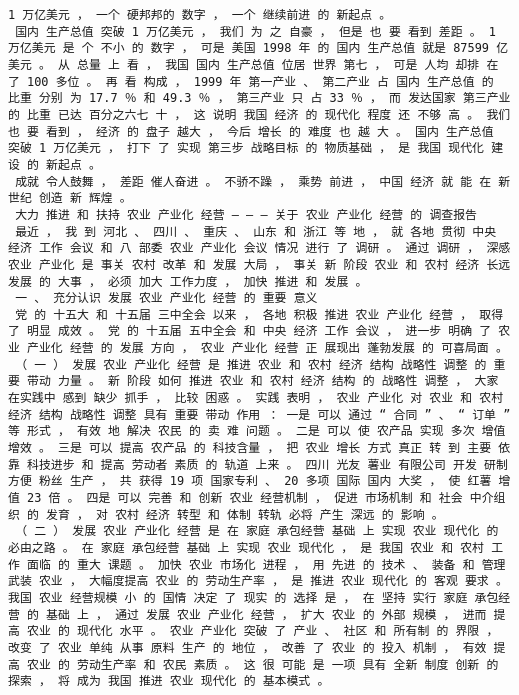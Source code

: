 \documentclass{article}
\begin{document}
\begin{Verbatim}[commandchars=\\\{\}]
 1 万亿美元 ， 一个 硬邦邦的 数字 ， 一个 继续前进 的 新起点 。 
 国内 生产总值 突破 1 万亿美元 ， 我们 为 之 自豪 ， 但是 也 要 看到 差距 。 1 万亿美元 是 个 不小 的 数字 ， 可是 美国 1998 年 的 国内 生产总值 就是 87599 亿美元 。 从 总量 上 看 ， 我国 国内 生产总值 位居 世界 第七 ， 可是 人均 却排 在 了 100 多位 。 再 看 构成 ， 1999 年 第一产业 、 第二产业 占 国内 生产总值 的 比重 分别 为 17.7 ％ 和 49.3 ％ ， 第三产业 只 占 33 ％ ， 而 发达国家 第三产业 的 比重 已达 百分之六七 十 ， 这 说明 我国 经济 的 现代化 程度 还 不够 高 。 我们 也 要 看到 ， 经济 的 盘子 越大 ， 今后 增长 的 难度 也 越 大 。 国内 生产总值 突破 1 万亿美元 ， 打下 了 实现 第三步 战略目标 的 物质基础 ， 是 我国 现代化 建设 的 新起点 。 
 成就 令人鼓舞 ， 差距 催人奋进 。 不骄不躁 ， 乘势 前进 ， 中国 经济 就 能 在 新世纪 创造 新 辉煌 。 
 大力 推进 和 扶持 农业 产业化 经营 — — — 关于 农业 产业化 经营 的 调查报告 
 最近 ， 我 到 河北 、 四川 、 重庆 、 山东 和 浙江 等 地 ， 就 各地 贯彻 中央 经济 工作 会议 和 八 部委 农业 产业化 会议 情况 进行 了 调研 。 通过 调研 ， 深感 农业 产业化 是 事关 农村 改革 和 发展 大局 ， 事关 新 阶段 农业 和 农村 经济 长远 发展 的 大事 ， 必须 加大 工作力度 ， 加快 推进 和 发展 。 
 一 、 充分认识 发展 农业 产业化 经营 的 重要 意义 
 党 的 十五大 和 十五届 三中全会 以来 ， 各地 积极 推进 农业 产业化 经营 ， 取得 了 明显 成效 。 党 的 十五届 五中全会 和 中央 经济 工作 会议 ， 进一步 明确 了 农业 产业化 经营 的 发展 方向 ， 农业 产业化 经营 正 展现出 蓬勃发展 的 可喜局面 。 
 （ 一 ） 发展 农业 产业化 经营 是 推进 农业 和 农村 经济 结构 战略性 调整 的 重要 带动 力量 。 新 阶段 如何 推进 农业 和 农村 经济 结构 的 战略性 调整 ， 大家 在实践中 感到 缺少 抓手 ， 比较 困惑 。 实践 表明 ， 农业 产业化 对 农业 和 农村 经济 结构 战略性 调整 具有 重要 带动 作用 ： 一是 可以 通过 “ 合同 ” 、 “ 订单 ” 等 形式 ， 有效 地 解决 农民 的 卖 难 问题 。 二是 可以 使 农产品 实现 多次 增值 增效 。 三是 可以 提高 农产品 的 科技含量 ， 把 农业 增长 方式 真正 转 到 主要 依靠 科技进步 和 提高 劳动者 素质 的 轨道 上来 。 四川 光友 薯业 有限公司 开发 研制 方便 粉丝 生产 ， 共 获得 19 项 国家专利 、 20 多项 国际 国内 大奖 ， 使 红薯 增值 23 倍 。 四是 可以 完善 和 创新 农业 经营机制 ， 促进 市场机制 和 社会 中介组织 的 发育 ， 对 农村 经济 转型 和 体制 转轨 必将 产生 深远 的 影响 。 
 （ 二 ） 发展 农业 产业化 经营 是 在 家庭 承包经营 基础 上 实现 农业 现代化 的 必由之路 。 在 家庭 承包经营 基础 上 实现 农业 现代化 ， 是 我国 农业 和 农村 工作 面临 的 重大 课题 。 加快 农业 市场化 进程 ， 用 先进 的 技术 、 装备 和 管理 武装 农业 ， 大幅度提高 农业 的 劳动生产率 ， 是 推进 农业 现代化 的 客观 要求 。 我国 农业 经营规模 小 的 国情 决定 了 现实 的 选择 是 ， 在 坚持 实行 家庭 承包经营 的 基础 上 ， 通过 发展 农业 产业化 经营 ， 扩大 农业 的 外部 规模 ， 进而 提高 农业 的 现代化 水平 。 农业 产业化 突破 了 产业 、 社区 和 所有制 的 界限 ， 改变 了 农业 单纯 从事 原料 生产 的 地位 ， 改善 了 农业 的 投入 机制 ， 有效 提高 农业 的 劳动生产率 和 农民 素质 。 这 很 可能 是 一项 具有 全新 制度 创新 的 探索 ， 将 成为 我国 推进 农业 现代化 的 基本模式 。 

\end{Verbatim}
\end{document}
